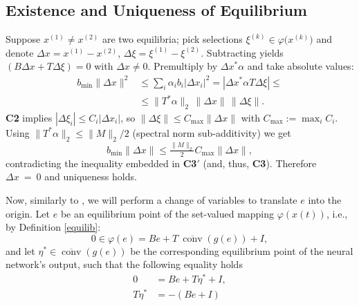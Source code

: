 \documentclass[journal]{IEEEtran}
\newtheorem{theorem}{Theorem}
\begin{document}
\subsection{Existence and Uniqueness of Equilibrium}
Suppose $x^{(1)}\neq x^{(2)}$ are two equilibria; pick selections
$\xi^{(k)}\in\varphi\bigl(x^{(k)}\bigr)$ and denote
$\Delta x=x^{(1)}-x^{(2)}$, $\Delta\xi=\xi^{(1)}-\xi^{(2)}$.  
Subtracting yields
$(B\Delta x+T\Delta\xi)=0$ with $\Delta x\neq0$.  
Premultiply by
$\Delta x^{\!*}\alpha$ and take absolute values:
\begin{equation}\label{eq:uniq}
\begin{aligned}
    b_{\min}\|\Delta x\|^{2}
  &\leqslant \sum_{i}\alpha_i b_i|\Delta x_i|^{2}
  = |\Delta x^{\!*}\alpha T\Delta\xi| \leqslant \\
  &
  \leqslant \|T^{\!*}\alpha\|_{2}\,\|\Delta x\|\,\|\Delta\xi\|.
\end{aligned}
\end{equation}
\textbf{C2} implies $|\Delta\xi_i|\leqslant C_i|\Delta x_i|$, so
\(\|\Delta\xi\|\leqslant C_{\max}\|\Delta x\|\) with $C_{\max}:=\max_i C_i$.
Using $\|T^{\!*}\alpha\|_{2}\leqslant \|M\|_{2}/2$ (spectral norm sub‑additivity)
we get
\[
  b_{\min}\|\Delta x\|\leqslant \tfrac{\|M\|_{2}}{2}C_{\max}\|\Delta x\|,
\]
contradicting the inequality embedded in \textbf{C3$'$} (and, thus, \textbf{C3}). 
Therefore $\Delta x~=~0$ and
uniqueness holds.

Now, similarly to \cite{p1}, we will perform a change of variables to translate $e$ into the origin. Let $e$ be an equilibrium point of the set-valued mapping $\varphi(x(t))$, i.e., by Definition \ref{equilib}:
\[
0 \in \varphi(e)=Be+T~\overline{\operatorname{conv}}(g(e))+I ,
\]
and let $\eta^* \in \overline{\operatorname{conv}}(g(e))$ be the corresponding equilibrium point of the neural network's output, such that the following equality holds
\begin{equation}\label{eq:outputequilib}
    \begin{aligned}
0 &= Be + T \eta^*+ I,\\
T \eta^* &= -(Be+I)
    \end{aligned}
\end{equation}
\end{document}
